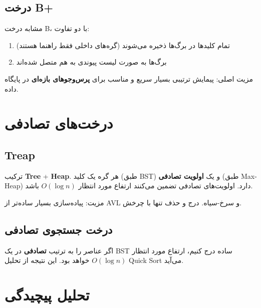 \documentclass{matinbook}
\begin{document}
    \subsection{درخت B+}
    
    \begin{definition}[درخت B+]
        مشابه درخت B، با دو تفاوت:
        \begin{enumerate}
            \item تمام کلیدها در برگ‌ها ذخیره می‌شوند
            (گره‌های داخلی فقط راهنما هستند)
            \item برگ‌ها به صورت لیست پیوندی
            به هم متصل شده‌اند
        \end{enumerate}
        \label{def:b-plus-tree}
    \end{definition}
    
    مزیت اصلی: پیمایش ترتیبی بسیار سریع
    و مناسب برای \textbf{پرس‌وجوهای بازه‌ای}
    در پایگاه داده.
    
    \section{درخت‌های تصادفی}
    
    \subsection{Treap}
    
    \begin{definition}[Treap]
        ترکیب \textbf{Tree} + \textbf{Heap}.
        هر گره یک کلید (طبق BST) و یک
        \textbf{اولویت تصادفی} (طبق Max-Heap) دارد.
        اولویت‌های تصادفی تضمین می‌کنند
        ارتفاع مورد انتظار $O(\log n)$ باشد.
        \label{def:treap}
    \end{definition}
    
    مزیت: پیاده‌سازی بسیار ساده‌تر از AVL
    و سرخ-سیاه. درج و حذف تنها با چرخش.
    
    \subsection{درخت جستجوی تصادفی}
    
    اگر عناصر را به ترتیب \textbf{تصادفی}
    در یک BST ساده درج کنیم،
    ارتفاع مورد انتظار $O(\log n)$ خواهد بود.
    این نتیجه از تحلیل Quick Sort می‌آید.
    
    \section{تحلیل پیچیدگی}
    
\end{document}
